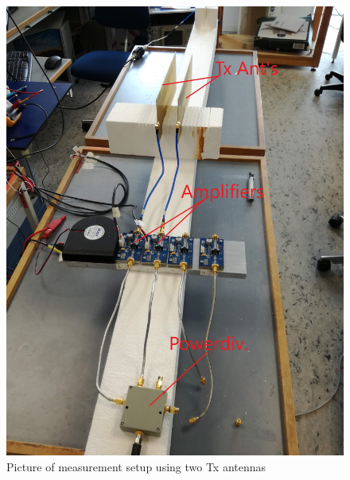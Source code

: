 \begin{figure}[H]
\centering 
\includegraphics[scale = 0.1]{figures/measurement/cree/meas3/meas3.jpg}
\caption{Picture of measurement setup using two Tx antennas}
\label{fig:meas_amp3-2}
\end{figure}

